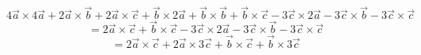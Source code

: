\documentclass{article}
\begin{document}
\[ 4\vec{a} \times 4\vec{a} + 2\vec{a} \times \vec{b} + 2\vec{a} \times \vec{c} + \vec{b} \times 2\vec{a} + \vec{b} \times \vec{b} + \vec{b} \times \vec{c} -3\vec{c} \times 2\vec{a} - 3\vec{c} \times \vec{b} - 3\vec{c} \times \vec{c}\]
\[ = 2\vec{a} \times \vec{c} + \vec{b} \times \vec{c} - 3\vec{c} \times 2\vec{a} - 3\vec{c} \times \vec{b} - 3\vec{c} \times \vec{c} \]
\[ = 2\vec{a} \times \vec{c} + 2\vec{a} \times 3\vec{c} + \vec{b} \times \vec{c} + \vec{b} \times 3\vec{c} \]
\end{document}
